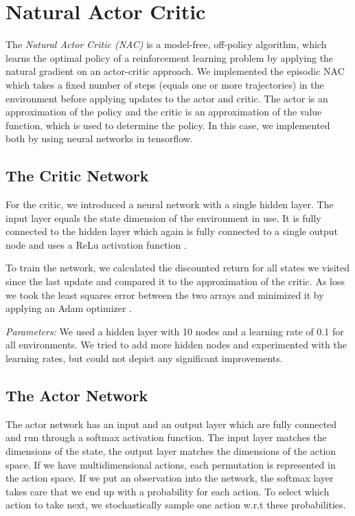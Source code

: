 
\section{Natural Actor Critic}
\label{sec:nac}

The \textit{Natural Actor Critic (NAC)} \citep{peters2008natural} is a model-free, off-policy algorithm, which learns the optimal policy of a reinforcement learning problem by applying the natural gradient \citep{amari1998natural} on an actor-critic \citep{sutton1998introduction} approach. We implemented the episodic NAC \citep{peters2008natural} which takes a fixed number of steps (equals one or more trajectories) in the environment before applying updates to the actor and critic. The actor is an approximation of the policy and the critic is an approximation of the value function, which is used to determine the policy. In this case, we implemented both by using neural networks in tensorflow.

\subsection{The Critic Network}
For the critic, we introduced a neural network with a single hidden layer. The input layer equals the state dimension of the environment in use. It is fully connected to the hidden layer which again is fully connected to a single output node and uses a ReLu activation function \citep{glorot2011deep}. 

To train the network, we calculated the discounted return for all states we visited since the last update and compared it to the approximation of the critic. As loss we took the least squares error between the two arrays and minimized it by applying an Adam optimizer \citep{kingma2014adam}.

\textit{Parameters:} We used a hidden layer with 10 nodes and a learning rate of 0.1 for all environments. We tried to add more hidden nodes and experimented with the learning rates, but could not depict any significant improvements.

\subsection{The Actor Network}

The actor network has an input and an output layer which are fully connected and run through a softmax activation function. The input layer matches the dimensions of the state, the output layer matches the dimensions of the action space. If we have multidimensional actions, each permutation is represented in the action space. If we put an observation into the network, the softmax layer takes care that we end up with a probability for each action. To select which action to take next, we stochastically sample one action w.r.t these probabilities.


